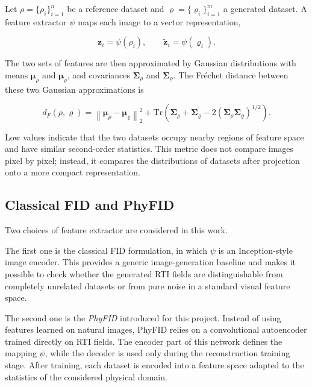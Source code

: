 Let $\rho=\{\rho_i\}_{i=1}^{n}$ be a reference dataset and
$\varrho=\{\varrho_i\}_{i=1}^{m}$ a generated dataset. A feature extractor
$\psi$ maps each image to a vector representation,

\begin{equation}
    \mathbf{z}_i = \psi(\rho_i),
    \qquad
    \widetilde{\mathbf{z}}_i = \psi(\varrho_i).
\end{equation}

The two sets of features are then approximated by Gaussian distributions with
means $\boldsymbol{\mu}_{\rho}$ and $\boldsymbol{\mu}_{\varrho}$, and
covariances $\mathbf{\Sigma}_{\rho}$ and $\mathbf{\Sigma}_{\varrho}$. The
Fr\'echet distance between these two Gaussian approximations is

\begin{equation}
    d_F(\rho,\varrho)
    =
    \left\|
    \boldsymbol{\mu}_{\rho}
    -
    \boldsymbol{\mu}_{\varrho}
    \right\|_2^2
    +
    \mathrm{Tr}\!\left(
        \mathbf{\Sigma}_{\rho}
        +
        \mathbf{\Sigma}_{\varrho}
        -
        2\left(\mathbf{\Sigma}_{\rho}\mathbf{\Sigma}_{\varrho}\right)^{1/2}
    \right).
\end{equation}

Low values indicate that the two datasets occupy nearby regions of feature
space and have similar second-order statistics. This metric does not compare
images pixel by pixel; instead, it compares the distributions of datasets after
projection onto a more compact representation.

\subsection{Classical FID and PhyFID}

Two choices of feature extractor are considered in this work.

The first one is the classical FID formulation, in which $\psi$ is an
Inception-style image encoder. This provides a generic image-generation
baseline and makes it possible to check whether the generated RTI fields are
distinguishable from completely unrelated datasets or from pure noise in a
standard visual feature space.

The second one is the \emph{PhyFID} introduced for this project. Instead of
using features learned on natural images, PhyFID relies on a convolutional
autoencoder trained directly on RTI fields. The encoder part of this network
defines the mapping $\psi$, while the decoder is used only during the
reconstruction training stage. After training, each dataset is encoded into a
feature space adapted to the statistics of the considered physical domain.

